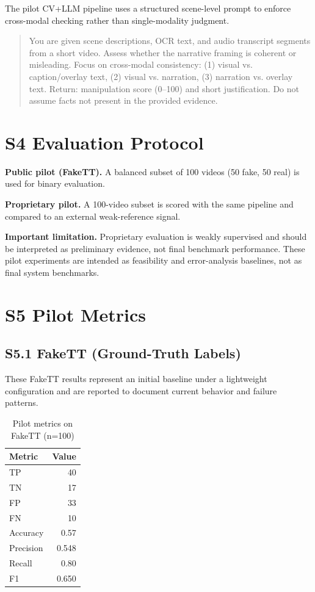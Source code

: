 \documentclass[runningheads]{llncs}
\begin{document}
The pilot CV+LLM pipeline uses a structured scene-level prompt to enforce cross-modal checking rather than single-modality judgment.

\begin{quote}
You are given scene descriptions, OCR text, and audio transcript segments from a short video.
Assess whether the narrative framing is coherent or misleading.
Focus on cross-modal consistency:
(1) visual vs. caption/overlay text,
(2) visual vs. narration,
(3) narration vs. overlay text.
Return: manipulation score (0--100) and short justification.
Do not assume facts not present in the provided evidence.
\end{quote}

\section*{S4 Evaluation Protocol}

\textbf{Public pilot (FakeTT).} A balanced subset of 100 videos (50 fake, 50 real) is used for binary evaluation.

\textbf{Proprietary pilot.} A 100-video subset is scored with the same pipeline and compared to an external weak-reference signal.

\textbf{Important limitation.} Proprietary evaluation is weakly supervised and should be interpreted as preliminary evidence, not final benchmark performance.
These pilot experiments are intended as feasibility and error-analysis baselines, not as final system benchmarks.

\section*{S5 Pilot Metrics}

\subsection*{S5.1 FakeTT (Ground-Truth Labels)}

These FakeTT results represent an initial baseline under a lightweight configuration and are reported to document current behavior and failure patterns.

\begin{table}[h]
\centering
\caption{Pilot metrics on FakeTT (n=100)}
\label{tab:fakett}
\footnotesize
\begin{tabular}{lr}
\toprule
\textbf{Metric} & \textbf{Value} \\
\midrule
TP & 40 \\
TN & 17 \\
FP & 33 \\
FN & 10 \\
Accuracy & 0.57 \\
Precision & 0.548 \\
Recall & 0.80 \\
F1 & 0.650 \\
\bottomrule
\end{tabular}
\end{table}
\end{document}
